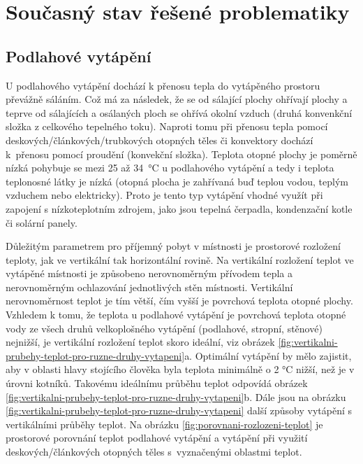 

\chapter{Současný stav řešené problematiky}


\section{Podlahové vytápění}

U podlahového vytápění dochází k přenosu tepla do vytápěného prostoru převážně sáláním. Což má za následek, že se od sálající plochy ohřívají plochy a teprve od sálajících a osálaných ploch se ohřívá okolní vzduch (druhá konvenkční složka z celkového tepelného toku). Naproti tomu při přenosu tepla pomocí deskových/článkových/trubkových otopných těles či konvektory dochází k~přenosu pomocí proudění (konvekční složka). Teplota otopné plochy je poměrně nízká pohybuje se mezi 25 až 34~°C u podlahového vytápění a tedy i teplota teplonosné látky je nízká (otopná plocha je zahřívaná buď teplou vodou, teplým vzduchem nebo elektricky). Proto je tento typ vytápění vhodné využít při zapojení s nízkoteplotním zdrojem, jako jsou tepelná čerpadla, kondenzační kotle či solární panely. \cite{basta-velkoplosne-vytapeni} \cite{valter-regulace-v-praxi}

Důležitým parametrem pro příjemný pobyt v místnosti je prostorové rozložení teploty, jak ve vertikální tak horizontální rovině. Na vertikální rozložení teplot ve vytápěné místnosti je způsobeno nerovnoměrným přívodem tepla a nerovnoměrným ochlazování jednotlivých stěn místnosti. Vertikální nerovnoměrnost teplot je tím větší, čím vyšší je povrchová teplota otopné plochy. Vzhledem k tomu, že teplota u podlahové vytápění je povrchová teplota otopné vody ze všech druhů velkoplošného vytápění (podlahové, stropní, stěnové) nejnižší, je vertikální rozložení teplot skoro ideální, viz obrázek \ref{fig:vertikalni-prubehy-teplot-pro-ruzne-druhy-vytapeni}a. Optimální vytápění by mělo zajistit, aby v oblasti hlavy stojícího člověka byla teplota minimálně o 2 °C nižší, než je v úrovni kotníků. Takovému ideálnímu průběhu teplot odpovídá obrázek \ref{fig:vertikalni-prubehy-teplot-pro-ruzne-druhy-vytapeni}b. Dále jsou na obrázku  \ref{fig:vertikalni-prubehy-teplot-pro-ruzne-druhy-vytapeni} další způsoby vytápění s vertikálními průběhy teplot. Na obrázku \ref{fig:porovnani-rozlozeni-teplot} je prostorové porovnání teplot podlahové vytápění a vytápění při využití deskových/článkových otopných těles s~vyznačenými oblastmi teplot. \cite{basta-velkoplosne-vytapeni} \cite{podlahove-vytapeni-prehled-trhu}


